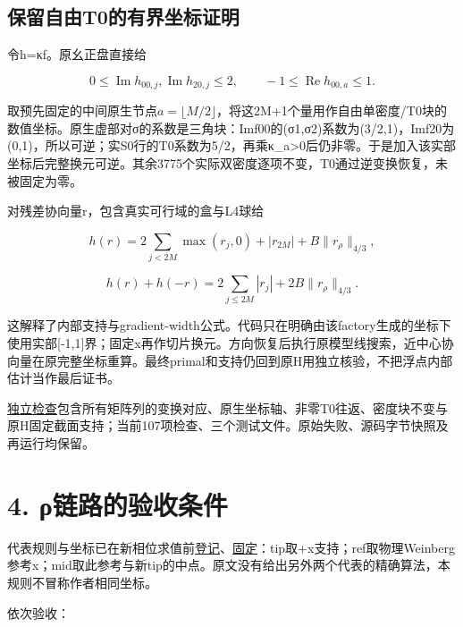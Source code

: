 \documentclass[
  10pt,
  a4paper,
]{article}
\begin{document}
\subsection{保留自由T0的有界坐标证明}\label{ux4fddux7559ux81eaux7531t0ux7684ux6709ux754cux5750ux6807ux8bc1ux660e}

令h=κf。原幺正盘直接给

\[0\le\operatorname{Im}h_{00,j},\operatorname{Im}h_{20,j}\le2,
\qquad -1\le\operatorname{Re}h_{00,a}\le1.\]

取预先固定的中间原生节点\(a=\lfloor M/2\rfloor\)，将这2M+1个量用作自由单密度/T0块的数值坐标。原生虚部对σ的系数是三角块：Imf00的(σ1,σ2)系数为(3/2,1)，Imf20为(0,1)，所以可逆；实S0行的T0系数为5/2，再乘κ\_a\textgreater0后仍非零。于是加入该实部坐标后完整换元可逆。其余3775个实际双密度逐项不变，T0通过逆变换恢复，未被固定为零。

对残差协向量r，包含真实可行域的盒与L4球给

\[h(r)=2\sum_{j<2M}\max(r_j,0)+|r_{2M}|+B\|r_\rho\|_{4/3},\]

\[h(r)+h(-r)=2\sum_{j\le2M}|r_j|+2B\|r_\rho\|_{4/3}.\]

这解释了内部支持与gradient-width公式。代码只在明确由该factory生成的坐标下使用实部{[}-1,1{]}界；固定x再作切片换元。方向恢复后执行原模型线搜索，近中心协向量在原完整坐标重算。最终primal和支持仍回到原H用独立核验，不把浮点内部估计当作最后证书。

\href{../verification_PV_bounded_coordinates.json}{独立检查}包含所有矩阵列的变换对应、原生坐标轴、非零T0往返、密度块不变与原H固定截面支持；当前107项检查、三个测试文件。原始失败、源码字节快照及再运行均保留。

\section{4.
ρ链路的验收条件}\label{ux3c1ux94feux8defux7684ux9a8cux6536ux6761ux4ef6}

代表规则与坐标已在新相位求值前\href{../PV_REPRESENTATIVE_RULE.json}{登记}、\href{../PV_FIXED_COORDINATES.json}{固定}：tip取+x支持；ref取物理Weinberg参考x；mid取此参考与新tip的中点。原文没有给出另外两个代表的精确算法，本规则不冒称作者相同坐标。

依次验收：
\end{document}
